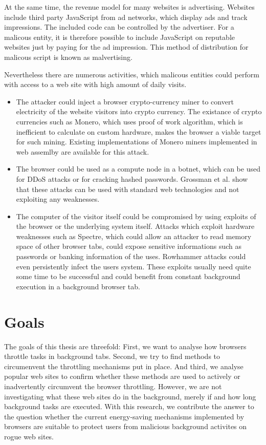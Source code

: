 \documentclass[
	ruledheaders=section,%
	class=report,%
	thesis={type=bachelor},%
	accentcolor=9c,%
	custommargins=true,%
	marginpar=false,%
	parskip=half-,%
	fontsize=11pt,%
]{tudapub}
\begin{document}
  At the same time, the revenue model for many websites is advertising. Websites include third party JavaScript from ad networks, which display ads and track impressions. The included code can be controlled by the advertiser. For a malicous entity, it is therefore possible to include JavaScript on reputable websites just by paying for the ad impression. This method of distribution for malicous script is known as malvertising\cite{wiki:malvertising}.
 

  Nevertheless there are numerous activities, which malicous entities could perform with access to a web site with high amount of daily visits.

  \begin{itemize}
  \item The attacker could inject a browser crypto-currency miner to convert electricity of the website visitors into crypto currency. The existance of crypto currencies such as Monero, which uses proof of work algorithm, which is inefficient to calculate on custom hardware, makes the browser a viable target for such mining. Existing implementations of Monero miners implemented in web assemlby are available for this attack.
  \item The browser could be used as a compute node in a botnet, which can be used for DDoS attacks or for cracking hashed passwords. Grossman et al.\cite{grossmann2013million} show that these attacks can be used with standard web technologies and not exploiting any weaknesses.
  \item The computer of the visitor itself could be compromised by using exploits of the browser or the underlying system itself. Attacks which exploit hardware weaknesses such as Spectre\cite{Kocher2018spectre}, which could allow an attacker to read memory space of other browser tabs, could expose sensitive informations such as passwords or banking information of the uses. Rowhammer\cite{rowhammer} attacks could even persistently infect the users system. These exploits usually need quite some time to be successful and could benefit from constant background execution in a background browser tab.
  \end{itemize}

  \section{Goals}

  The goals of this thesis are threefold: First, we want to analyse how browsers throttle tasks in background tabs. Second, we try to find methods to circumenvent the throttling mechanisms put in place. And third, we analyse popular web sites to confirm whether these methods are used to actively or inadvertently circumvent the browser throttling. However, we are not investigating what these web sites do in the background, merely if and how long background tasks are executed. With this research, we contribute the answer to the question whether the current energy-saving mechanisms implemented by browsers are suitable to protect users from malicious background activites on rogue web sites.
\end{document}
